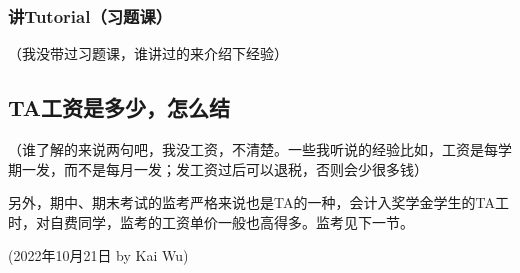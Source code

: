 \subsubsection{讲Tutorial（习题课）}
（我没带过习题课，谁讲过的来介绍下经验）


\subsection{TA工资是多少，怎么结}
（谁了解的来说两句吧，我没工资，不清楚。一些我听说的经验比如，工资是每学期一发，而不是每月一发；发工资过后可以退税，否则会少很多钱）



\emptyline{}
另外，期中、期末考试的监考严格来说也是TA的一种，会计入奖学金学生的TA工时，对自费同学，监考的工资单价一般也高得多。监考见下一节。


\begin{flushright}
(2022年10月21日 by Kai Wu)
\end{flushright}
